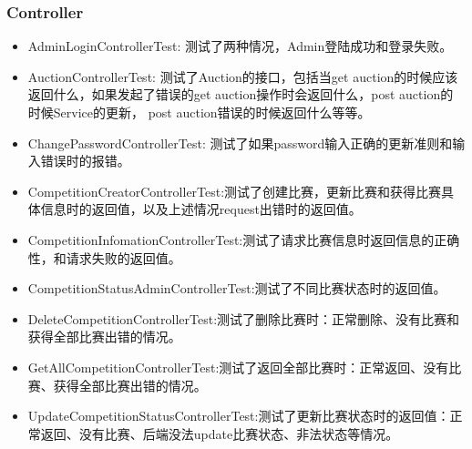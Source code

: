 \documentclass[12pt, a4paper,UTF8]{article}
\begin{document}
					\subsubsection{Controller}
							\begin{itemize}
							\item AdminLoginControllerTest: 测试了两种情况，Admin登陆成功和登录失败。
							\item AuctionControllerTest: 测试了Auction的接口，包括当get auction的时候应该返回什么，如果发起了错误的get auction操作时会返回什么，post auction的时候Service的更新， post auction错误的时候返回什么等等。
							\item ChangePasswordControllerTest: 测试了如果password输入正确的更新准则和输入错误时的报错。
							\item CompetitionCreatorControllerTest:测试了创建比赛，更新比赛和获得比赛具体信息时的返回值，以及上述情况request出错时的返回值。
							\item CompetitionInfomationControllerTest:测试了请求比赛信息时返回信息的正确性，和请求失败的返回值。
							\item CompetitionStatusAdminControllerTest:测试了不同比赛状态时的返回值。
							\item DeleteCompetitionControllerTest:测试了删除比赛时：正常删除、没有比赛和获得全部比赛出错的情况。
							\item GetAllCompetitionControllerTest:测试了返回全部比赛时：正常返回、没有比赛、获得全部比赛出错的情况。
							\item UpdateCompetitionStatusControllerTest:测试了更新比赛状态时的返回值：正常返回、没有比赛、后端没法update比赛状态、非法状态等情况。
							\end{itemize}
\end{document}
